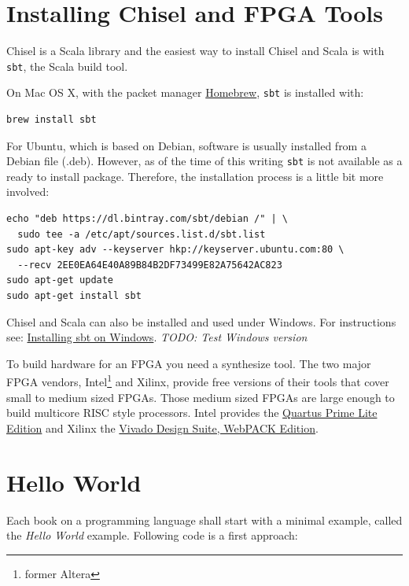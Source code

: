 \documentclass[%
    10pt, %
    headinclude, footexclude,
    openright, %
    notitlepage,
    cleardoubleempty,
    headsepline,
    pointlessnumbers,
    bibtotoc, idxtotoc,
    ]{scrbook}
\newcommand{\code}[1]{{\small{\texttt{#1}}}}
\newcommand{\todo}[1]{{\emph{TODO: #1}}}
\newcommand{\myref}[2]{\href{#1}{#2}}
\begin{document}
\section{Installing Chisel and FPGA Tools}

Chisel is a Scala library and the easiest way to install Chisel and Scala is
with \code{sbt}, the Scala build tool.

On Mac OS X, with the packet manager \myref{https://brew.sh/}{Homebrew},
\code{sbt} is installed with:

\begin{verbatim}
brew install sbt
\end{verbatim}

\noindent For Ubuntu, which is based on Debian, software is usually installed from a
Debian file (.deb). However, as of the time of this writing \code{sbt} is not
available as a ready to install package. Therefore, the installation process
is a little bit more involved:
\begin{verbatim}
echo "deb https://dl.bintray.com/sbt/debian /" | \
  sudo tee -a /etc/apt/sources.list.d/sbt.list
sudo apt-key adv --keyserver hkp://keyserver.ubuntu.com:80 \
  --recv 2EE0EA64E40A89B84B2DF73499E82A75642AC823
sudo apt-get update
sudo apt-get install sbt
\end{verbatim}



Chisel and Scala can also be installed and used under Windows.
For instructions see:
\myref{https://www.scala-sbt.org/1.x/docs/Installing-sbt-on-Windows.html}{Installing sbt on Windows}.
\todo{Test Windows version}

To build hardware for an FPGA you need a synthesize tool. The two major
FPGA vendors, Intel\footnote{former Altera} and Xilinx, provide free versions of
their tools that cover small to medium sized FPGAs. Those medium sized
FPGAs are large enough to build multicore RISC style processors.
Intel provides the \myref{https://www.altera.com/products/design-software/fpga-design/quartus-prime/download.html}{Quartus Prime Lite Edition} and Xilinx the
\myref{https://www.xilinx.com/products/design-tools/vivado/vivado-webpack.html}{Vivado Design Suite, WebPACK Edition}.

\section{Hello World}

Each book on a programming language shall start with a minimal example,
called the \emph{Hello World} example. Following code is a first approach:
\end{document}
